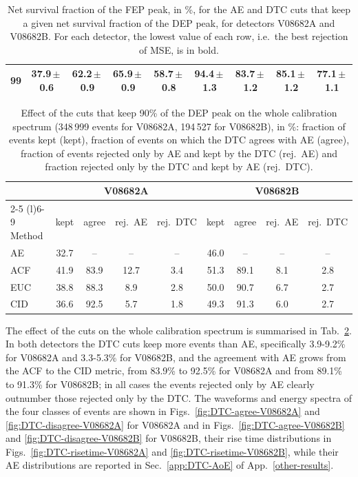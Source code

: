 \begin{table}[H]
\begin{tabular}{ccccccccc}
        99 & \textbf{37.9}\,$\pm$\,0.6 & 62.2\,$\pm$\,0.9 & 65.9\,$\pm$\,0.9 & 58.7\,$\pm$\,0.8 & 94.4\,$\pm$\,1.3 & 83.7\,$\pm$\,1.2 & 85.1\,$\pm$\,1.2 & \textbf{77.1}\,$\pm$\,1.1 \\
        \bottomrule
    \end{tabular}
    \caption{Net survival fraction of the \ac{FEP} peak, in \%, for the \ac{AE} and \ac{DTC} cuts that keep a given net survival fraction of the \ac{DEP} peak, for detectors V08682A and V08682B. For each detector, the lowest value of each row, i.e.\ the best rejection of \ac{MSE}, is in bold.}
    \label{tab:net-scan-DTC}
\end{table}

\begin{table}[H]
    \centering
    \setlength{\tabcolsep}{5pt}
    \begin{tabular}{lcccccccc}
        \toprule
        & \multicolumn{4}{c}{V08682A} & \multicolumn{4}{c}{V08682B} \\
        \cmidrule(lr){2-5} \cmidrule(l){6-9}
        Method & kept & agree & rej.~\acs{AE} & rej.~\acs{DTC} & kept & agree & rej.~\acs{AE} & rej.~\acs{DTC} \\
        \midrule
        \acs{AE}  & 32.7 & --   & --   & --  & 46.0 & --   & --  & --  \\
        \acs{ACF} & 41.9 & 83.9 & 12.7 & 3.4 & 51.3 & 89.1 & 8.1 & 2.8 \\
        \acs{EUC} & 38.8 & 88.3 &  8.9 & 2.8 & 50.0 & 90.7 & 6.7 & 2.7 \\
        \acs{CID} & 36.6 & 92.5 &  5.7 & 1.8 & 49.3 & 91.3 & 6.0 & 2.7 \\
        \bottomrule
    \end{tabular}
    \caption{Effect of the cuts that keep 90\% of the \ac{DEP} peak on the whole calibration spectrum (348\,999 events for V08682A, 194\,527 for V08682B), in \%: fraction of events kept (kept), fraction of events on which the \ac{DTC} agrees with \ac{AE} (agree), fraction of events rejected only by \ac{AE} and kept by the \ac{DTC} (rej.~\acs{AE}) and fraction rejected only by the \ac{DTC} and kept by \ac{AE} (rej.~\acs{DTC}).}
    \label{tab:DTC-agreement}
\end{table}

The effect of the cuts on the whole calibration spectrum is summarised in Tab.~\ref{tab:DTC-agreement}. In both detectors the \ac{DTC} cuts keep more events than \ac{AE}, specifically 3.9-9.2\% for V08682A and 3.3-5.3\% for V08682B, and the agreement with \ac{AE} grows from the \ac{ACF} to the \ac{CID} metric, from 83.9\% to 92.5\% for V08682A and from 89.1\% to 91.3\% for V08682B; in all cases the events rejected only by \ac{AE} clearly outnumber those rejected only by the \ac{DTC}. The waveforms and energy spectra of the four classes of events are shown in Figs.~\ref{fig:DTC-agree-V08682A} and \ref{fig:DTC-disagree-V08682A} for V08682A and in Figs.~\ref{fig:DTC-agree-V08682B} and \ref{fig:DTC-disagree-V08682B} for V08682B, their rise time distributions in Figs.~\ref{fig:DTC-risetime-V08682A} and \ref{fig:DTC-risetime-V08682B}, while their \ac{AE} distributions are reported in Sec.~\ref{app:DTC-AoE} of App.~\ref{other-results}.

